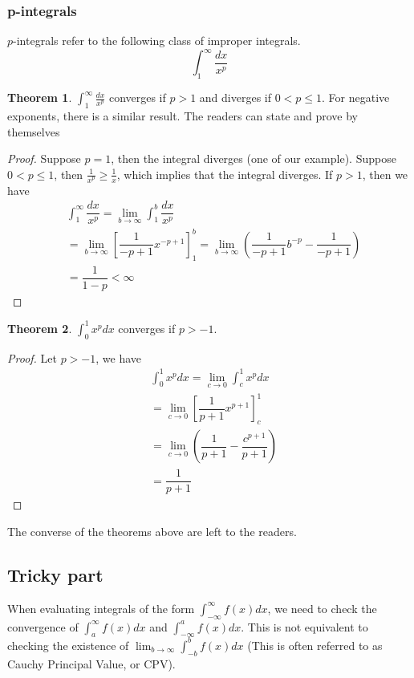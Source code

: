 \documentclass{article}
\theoremstyle{definition}
\theoremstyle{definition}
\theoremstyle{definition}
\theoremstyle{definition}
\theoremstyle{definition}
\theoremstyle{definition}
\theoremstyle{definition}
\theoremstyle{definition}
\theoremstyle{definition}
\newtheorem{theorem}{Theorem}[section]
\begin{document}
\subsubsection{p-integrals}
$p$-integrals refer to the following class of improper integrals.
\[
\int_1^\infty\dfrac{dx}{x^p}    
\]
\begin{theorem}
    $\int_1^\infty\frac{dx}{x^p}$ converges if $p>1$ and diverges if $0<p\le 1$. For negative exponents, there is a similar result. The readers can state and prove by themselves
\end{theorem}
\begin{proof}
    Suppose $p=1$, then the integral diverges (one of our example). Suppose $0<p\le 1$, then $\frac{1}{x^p}\ge \frac{1}{x}$, which implies that the integral diverges.
    If $p>1$, then we have 
    \begin{align*}
        &\int_1^\infty\dfrac{dx}{x^p}=\lim_{b\to\infty}\int_1^b\dfrac{dx}{x^p}\\
        &=\lim_{b\to\infty}\left[\dfrac{1}{-p+1}x^{-p+1}\right]_1^b=\lim_{b\to\infty}\left(\dfrac{1}{-p+1}b^{-p}-\dfrac{1}{-p+1}\right)\\
        &=\dfrac{1}{1-p}<\infty
    \end{align*}
\end{proof}
\begin{theorem}
    $\int_0^1x^pdx$ converges if $p>-1$.
\end{theorem}
\begin{proof}
    Let $p>-1$, we have
    \begin{align*}
        &\int_0^1x^pdx=\lim_{c\to 0}\int_c^1x^pdx\\
        &=\lim_{c\to0}\left[\dfrac{1}{p+1}x^{p+1}\right]_c^1\\
        &=\lim_{c\to0}\left(\dfrac{1}{p+1}-\dfrac{c^{p+1}}{p+1}\right)\\
        &=\dfrac{1}{p+1}
    \end{align*}
\end{proof}
The converse of the theorems above are left to the readers.
\subsection{Tricky part}
When evaluating integrals of the form $\int_{-\infty}^\infty f(x)dx$,
we need to check the convergence of $\int_a^\infty f(x)dx$ and $\int_{-\infty}^a f(x)dx$.
This is not equivalent to checking the existence of $\lim_{b\to\infty}\int_{-b}^b f(x)dx$ (This is often referred to as Cauchy Principal Value, or CPV).
\end{document}
